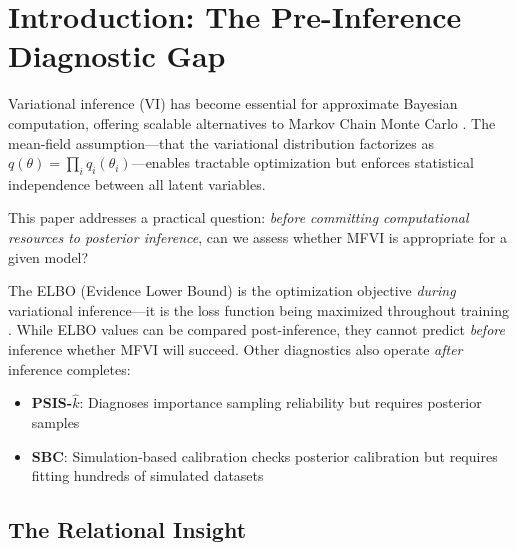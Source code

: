 \documentclass[10pt]{article} %
\theoremstyle{plain}
\theoremstyle{definition}
\begin{document}
\begin{abstract}
Validation spans stochastic volatility filters, hierarchical linear models, and three-layer hierarchies, yielding a practical pre-inference workflow. The framework clarifies a fundamental asymmetry: \emph{what you can learn} from a relationship (inference) depends only on coupling strength, while \emph{what you can do} through a relationship (control) depends on both coupling and scale.
\end{abstract}

\section{Introduction: The Pre-Inference Diagnostic Gap}
\label{sec:intro}

Variational inference (VI) has become essential for approximate Bayesian computation, offering scalable alternatives to Markov Chain Monte Carlo \citep{blei2017variational}. The mean-field assumption---that the variational distribution factorizes as $q(\theta) = \prod_i q_i(\theta_i)$---enables tractable optimization but enforces statistical independence between all latent variables.

This paper addresses a practical question: \emph{before committing computational resources to posterior inference}, can we assess whether MFVI is appropriate for a given model?

The ELBO (Evidence Lower Bound) is the optimization objective \emph{during} variational inference---it is the loss function being maximized throughout training \citep{blei2017variational}. While ELBO values can be compared post-inference, they cannot predict \emph{before} inference whether MFVI will succeed. Other diagnostics also operate \emph{after} inference completes:
\begin{itemize}
    \item \textbf{PSIS-$\hat{k}$}: Diagnoses importance sampling reliability but requires posterior samples \citep{vehtari2017practical}
    \item \textbf{SBC}: Simulation-based calibration checks posterior calibration but requires fitting hundreds of simulated datasets \citep{talts2018validating}
\end{itemize}

\subsection{The Relational Insight}
\end{document}
